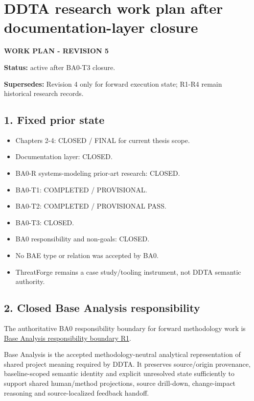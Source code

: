 \documentclass[
  10pt,
]{article}
\author{}
\date{}
\providecommand{\tightlist}{%
  \setlength{\itemsep}{0pt}\setlength{\parskip}{0pt}}
\begin{document}
\section{DDTA research work plan after documentation-layer
closure}\label{ddta-research-work-plan-after-documentation-layer-closure}

\textbf{WORK PLAN - REVISION 5}

\textbf{Status:} active after BA0-T3 closure.

\textbf{Supersedes:} Revision 4 only for forward execution state; R1-R4
remain historical research records.

\subsection{1. Fixed prior state}\label{fixed-prior-state}

\begin{itemize}
\tightlist
\item
  Chapters 2-4: CLOSED / FINAL for current thesis scope.
\item
  Documentation layer: CLOSED.
\item
  BA0-R systems-modeling prior-art research: CLOSED.
\item
  BA0-T1: COMPLETED / PROVISIONAL.
\item
  BA0-T2: COMPLETED / PROVISIONAL PASS.
\item
  BA0-T3: CLOSED.
\item
  BA0 responsibility and non-goals: CLOSED.
\item
  No BAE type or relation was accepted by BA0.
\item
  ThreatForge remains a case study/tooling instrument, not DDTA semantic
  authority.
\end{itemize}

\subsection{2. Closed Base Analysis
responsibility}\label{closed-base-analysis-responsibility}

The authoritative BA0 responsibility boundary for forward methodology
work is \href{BA0_BASE_ANALYSIS_RESPONSIBILITY_BOUNDARY_R1.md}{Base
Analysis responsibility boundary R1}.

Base Analysis is the accepted methodology-neutral analytical
representation of shared project meaning required by DDTA. It preserves
source/origin provenance, baseline-scoped semantic identity and explicit
unresolved state sufficiently to support shared human/method
projections, source drill-down, change-impact reasoning and
source-localized feedback handoff.
\end{document}
